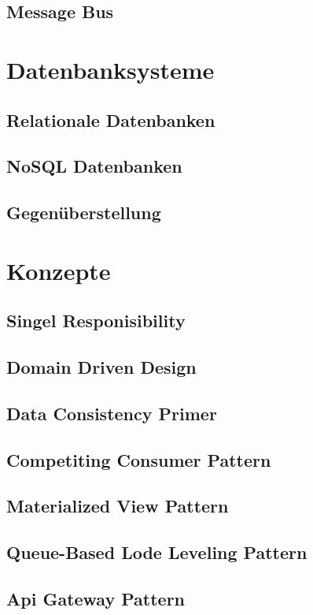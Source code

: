	\subsection{Message Bus}

\section{Datenbanksysteme}
	\subsection{Relationale Datenbanken}
	\subsection{NoSQL Datenbanken}
	\subsection{Gegenüberstellung}
	
\section{Konzepte}
	\subsection{Singel Responisibility}
	\subsection{Domain Driven Design}
	\subsection{Data Consistency Primer}
	\subsection{Competiting Consumer Pattern}
	\subsection{Materialized View Pattern}
	\subsection{Queue-Based Lode Leveling Pattern}
	\subsection{Api Gateway Pattern}
